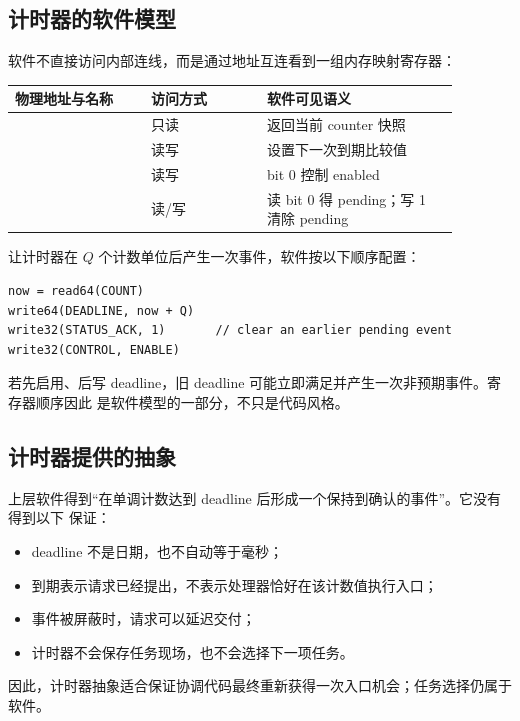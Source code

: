 \subsection{计时器的软件模型}

软件不直接访问内部连线，而是通过地址互连看到一组内存映射寄存器：

\begin{longtable}{|L{0.27\linewidth}|L{0.23\linewidth}|L{0.38\linewidth}|}
\hline
{}
物理地址与名称 & 访问方式 & 软件可见语义 \\ \hline
{} & 只读 & 返回当前 counter 快照 \\ \hline
{} & 读写 & 设置下一次到期比较值 \\ \hline
{} & 读写 & bit 0 控制 enabled \\ \hline
{} & 读/写 & 读 bit 0 得 pending；写 1 清除 pending \\ \hline
\end{longtable}

让计时器在 \(Q\) 个计数单位后产生一次事件，软件按以下顺序配置：

\begin{lstlisting}
now = read64(COUNT)
write64(DEADLINE, now + Q)
write32(STATUS_ACK, 1)       // clear an earlier pending event
write32(CONTROL, ENABLE)
\end{lstlisting}

若先启用、后写 deadline，旧 deadline 可能立即满足并产生一次非预期事件。寄存器顺序因此
是软件模型的一部分，不只是代码风格。

\subsection{计时器提供的抽象}

上层软件得到“在单调计数达到 deadline 后形成一个保持到确认的事件”。它没有得到以下
保证：

\begin{itemize}
\item deadline 不是日期，也不自动等于毫秒；
\item 到期表示请求已经提出，不表示处理器恰好在该计数值执行入口；
\item 事件被屏蔽时，请求可以延迟交付；
\item 计时器不会保存任务现场，也不会选择下一项任务。
\end{itemize}

因此，计时器抽象适合保证协调代码最终重新获得一次入口机会；任务选择仍属于软件。

